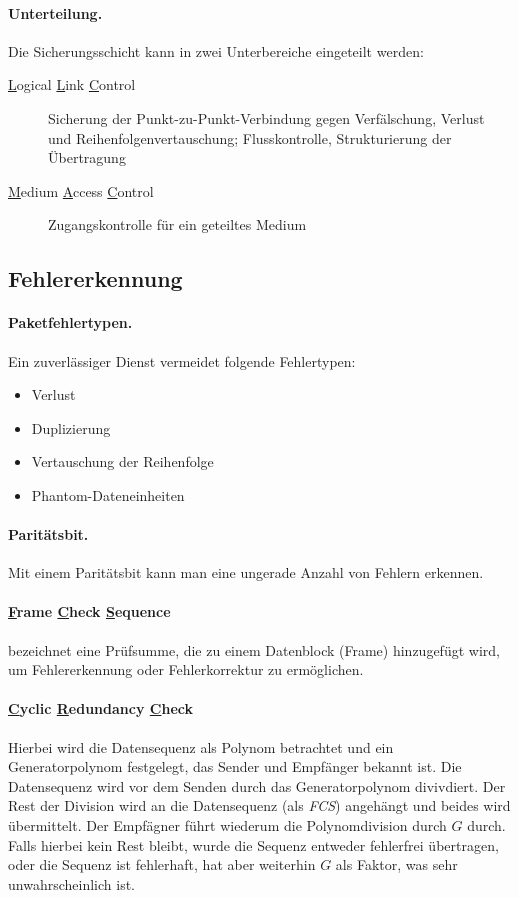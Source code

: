 \documentclass[]{scrartcl}
\begin{document}
\paragraph{Unterteilung.} Die Sicherungsschicht kann in zwei Unterbereiche eingeteilt werden:
\begin{description}
\item[\underline{L}ogical \underline{L}ink \underline{C}ontrol] Sicherung der Punkt-zu-Punkt-Verbindung gegen Verf\"alschung, Verlust und Reihenfolgenvertauschung; Flusskontrolle, Strukturierung der \"Ubertragung
\item[\underline{M}edium \underline{A}ccess \underline{C}ontrol] Zugangskontrolle f\"ur ein geteiltes Medium
\end{description}




\subsection{Fehlererkennung}

\paragraph{Paketfehlertypen.} Ein zuverl\"assiger Dienst vermeidet folgende Fehlertypen:
\begin{itemize}
\item Verlust
\item Duplizierung
\item Vertauschung der Reihenfolge
\item Phantom-Dateneinheiten
\end{itemize}



\paragraph{Parit\"atsbit. } Mit einem Parit\"atsbit kann man eine ungerade Anzahl von Fehlern erkennen.

\paragraph{\underline{F}rame \underline{C}heck \underline{S}equence} bezeichnet eine Pr\"ufsumme, die zu einem Datenblock (Frame) hinzugef\"ugt 
wird, um Fehlererkennung oder Fehlerkorrektur zu erm\"oglichen.

\paragraph{\underline{C}yclic \underline{R}edundancy \underline{C}heck}
Hierbei wird die Datensequenz als Polynom betrachtet und ein 
Generatorpolynom festgelegt, das Sender und Empf\"anger bekannt ist. Die Datensequenz wird vor dem Senden durch das Generatorpolynom divivdiert. Der Rest der Division wird an die Datensequenz (als \emph{FCS}) angeh\"angt und beides wird \"ubermittelt. Der Empf\"agner f\"uhrt wiederum die Polynomdivision durch $G$ durch. Falls hierbei kein Rest bleibt, wurde die Sequenz entweder fehlerfrei \"ubertragen, oder die Sequenz ist fehlerhaft, hat aber weiterhin $G$ als Faktor, was sehr unwahrscheinlich ist.
\end{document}
